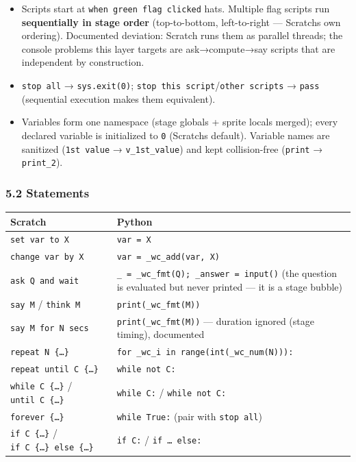 \documentclass[
]{article}
\newcounter{none} %
\providecommand{\tightlist}{%
  \setlength{\itemsep}{0pt}\setlength{\parskip}{0pt}}
\begin{document}
\begin{itemize}
\tightlist
\item
  Scripts start at \texttt{when\ green\ flag\ clicked} hats. Multiple
  flag scripts run \textbf{sequentially in stage order} (top-to-bottom,
  left-to-right --- Scratch\textquotesingle s own ordering). Documented
  deviation: Scratch runs them as parallel threads; the console problems
  this layer targets are ask→compute→say scripts that are independent by
  construction.
\item
  \texttt{stop\ all} → \texttt{sys.exit(0)};
  \texttt{stop\ this\ script}/\texttt{other\ scripts} → \texttt{pass}
  (sequential execution makes them equivalent).
\item
  Variables form one namespace (stage globals + sprite locals merged);
  every declared variable is initialized to \texttt{0}
  (Scratch\textquotesingle s default). Variable names are sanitized
  (\texttt{1st\ value} → \texttt{v\_1st\_value}) and kept collision-free
  (\texttt{print} → \texttt{print\_2}).
\end{itemize}

\subsubsection{5.2 Statements}\label{52-statements}

{\def\LTcaptype{none} %
\begin{longtable}[]{@{}ll@{}}
\toprule\noalign{}
Scratch & Python \\
\midrule\noalign{}
\endhead
\bottomrule\noalign{}
\endlastfoot
\texttt{set\ var\ to\ X} & \texttt{var\ =\ X} \\
\texttt{change\ var\ by\ X} & \texttt{var\ =\ \_wc\_add(var,\ X)} \\
\texttt{ask\ Q\ and\ wait} &
\texttt{\_\ =\ \_wc\_fmt(Q);\ \_answer\ =\ input()} (the question is
evaluated but never printed --- it is a stage bubble) \\
\texttt{say\ M} / \texttt{think\ M} & \texttt{print(\_wc\_fmt(M))} \\
\texttt{say\ M\ for\ N\ secs} & \texttt{print(\_wc\_fmt(M))} ---
duration ignored (stage timing), documented \\
\texttt{repeat\ N\ \{…\}} &
\texttt{for\ \_wc\_i\ in\ range(int(\_wc\_num(N))):} \\
\texttt{repeat\ until\ C\ \{…\}} & \texttt{while\ not\ C:} \\
\texttt{while\ C\ \{…\}} / \texttt{until\ C\ \{…\}} & \texttt{while\ C:}
/ \texttt{while\ not\ C:} \\
\texttt{forever\ \{…\}} & \texttt{while\ True:} (pair with
\texttt{stop\ all}) \\
\texttt{if\ C\ \{…\}} / \texttt{if\ C\ \{…\}\ else\ \{…\}} &
\texttt{if\ C:} / \texttt{if\ …\ else:} \\
\end{longtable}
}
\end{document}
